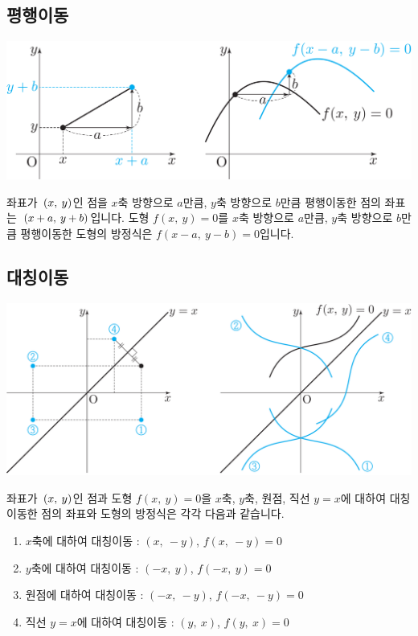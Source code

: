 \subsection{평행이동}
\begin{center}
\includegraphics[scale=0.125]{pic0/pic149.pdf}
\end{center} 좌표가 $\mathrm{}\left(x,\:y\right)$인 점을 $x$축 방향으로 $a$만큼, $y$축 방향으로 $b$만큼 평행이동한 점의 좌표는 $\mathrm{}\left(x+a,\:y+b\right)$입니다. 도형 $f(x,\:y)=0$를 $x$축 방향으로 $a$만큼, $y$축 방향으로 $b$만큼 평행이동한 도형의 방정식은 $f(x-a,\:y-b)=0$입니다.

\subsection{대칭이동}
\begin{center}
\includegraphics[scale=0.125]{pic0/pic150.pdf}
\end{center}좌표가 $\mathrm{}\left(x,\:y\right)$인 점과 도형 $f(x,\:y)=0$을 $x$축, $y$축, 원점, 직선 $y=x$에 대하여 대칭이동한 점의 좌표와 도형의 방정식은 각각 다음과 같습니다.
\begin{justbox}
  \begin{enumerate}[label=\onum*]
    \item $x$축에 대하여 대칭이동 : $(x,\: -y)$, $f(x,\:-y)=0$
    \item $y$축에 대하여 대칭이동 : $(-x,\: y)$, $f(-x,\: y)=0$
    \item 원점에 대하여 대칭이동 :  $(-x,\: -y)$, $f(-x,\:-y)=0$
    \item 직선 $y=x$에 대하여 대칭이동 : $(y,\: x)$, $f(y,\: x)=0$
  \end{enumerate}
\end{justbox}

